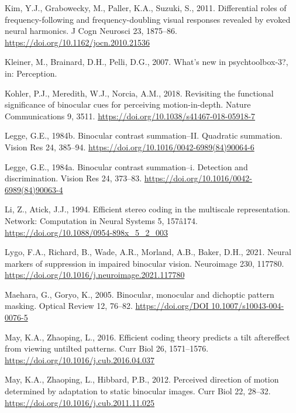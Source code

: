 \documentclass[review,
  12pt,
]{elsarticle}
\newlength{\cslhangindent}
\newenvironment{CSLReferences}[2] %
 {\begin{list}{}{%
  \setlength{\itemindent}{0pt}
  \setlength{\leftmargin}{0pt}
  \setlength{\parsep}{0pt}
  \ifodd #1
   \setlength{\leftmargin}{\cslhangindent}
   \setlength{\itemindent}{-1\cslhangindent}
  \fi
  \setlength{\itemsep}{#2\baselineskip}}}
 {\end{list}}
\begin{document}
\begin{CSLReferences}{1}{0}
Kim, Y.J., Grabowecky, M., Paller, K.A., Suzuki, S., 2011. Differential
roles of frequency-following and frequency-doubling visual responses
revealed by evoked neural harmonics. J Cogn Neurosci 23, 1875--86.
\url{https://doi.org/10.1162/jocn.2010.21536}

Kleiner, M., Brainard, D.H., Pelli, D.G., 2007. What's new in
psychtoolbox-3?, in: Perception.

Kohler, P.J., Meredith, W.J., Norcia, A.M., 2018. Revisiting the
functional significance of binocular cues for perceiving
motion-in-depth. Nature Communications 9, 3511.
\url{https://doi.org/10.1038/s41467-018-05918-7}

Legge, G.E., 1984b. Binocular contrast summation--II. Quadratic
summation. Vision Res 24, 385--94.
\url{https://doi.org/10.1016/0042-6989(84)90064-6}

Legge, G.E., 1984a. Binocular contrast summation--i. Detection and
discrimination. Vision Res 24, 373--83.
\url{https://doi.org/10.1016/0042-6989(84)90063-4}

Li, Z., Atick, J.J., 1994. Efficient stereo coding in the multiscale
representation. Network: Computation in Neural Systems 5, 157â174.
\url{https://doi.org/10.1088/0954-898x_5_2_003}

Lygo, F.A., Richard, B., Wade, A.R., Morland, A.B., Baker, D.H., 2021.
Neural markers of suppression in impaired binocular vision. Neuroimage
230, 117780. \url{https://doi.org/10.1016/j.neuroimage.2021.117780}

Maehara, G., Goryo, K., 2005. Binocular, monocular and dichoptic pattern
masking. Optical Review 12, 76--82.
\href{https://doi.org/DOI\%2010.1007/s10043-004-0076-5}{https://doi.org/DOI
10.1007/s10043-004-0076-5}

May, K.A., Zhaoping, L., 2016. Efficient coding theory predicts a tilt
aftereffect from viewing untilted patterns. Curr Biol 26, 1571--1576.
\url{https://doi.org/10.1016/j.cub.2016.04.037}

May, K.A., Zhaoping, L., Hibbard, P.B., 2012. Perceived direction of
motion determined by adaptation to static binocular images. Curr Biol
22, 28--32. \url{https://doi.org/10.1016/j.cub.2011.11.025}


\end{CSLReferences}
\end{document}

